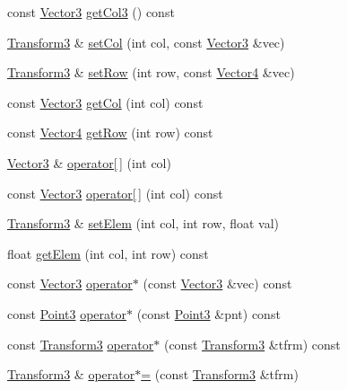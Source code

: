 \begin{DoxyCompactItemize}
\item 
const \hyperlink{classVectormath_1_1Aos_1_1Vector3}{Vector3} \hyperlink{classVectormath_1_1Aos_1_1Transform3_a06e3160b31b82a325a0a204082bc4720}{get\-Col3} () const 
\item 
\hyperlink{classVectormath_1_1Aos_1_1Transform3}{Transform3} \& \hyperlink{classVectormath_1_1Aos_1_1Transform3_a0a4ba5d1dbbdb94b14efacc20897d001}{set\-Col} (int col, const \hyperlink{classVectormath_1_1Aos_1_1Vector3}{Vector3} \&vec)
\item 
\hyperlink{classVectormath_1_1Aos_1_1Transform3}{Transform3} \& \hyperlink{classVectormath_1_1Aos_1_1Transform3_a0bc58cd41ab7c52cda6f86e1780d1ad4}{set\-Row} (int row, const \hyperlink{classVectormath_1_1Aos_1_1Vector4}{Vector4} \&vec)
\item 
const \hyperlink{classVectormath_1_1Aos_1_1Vector3}{Vector3} \hyperlink{classVectormath_1_1Aos_1_1Transform3_a6c04fe588c10315223cb2583618b260e}{get\-Col} (int col) const 
\item 
const \hyperlink{classVectormath_1_1Aos_1_1Vector4}{Vector4} \hyperlink{classVectormath_1_1Aos_1_1Transform3_ac38d9f289e1d523c7aaeb980d31532a6}{get\-Row} (int row) const 
\item 
\hyperlink{classVectormath_1_1Aos_1_1Vector3}{Vector3} \& \hyperlink{classVectormath_1_1Aos_1_1Transform3_ae72712700374ed276af6e06f2eae50a1}{operator\mbox{[}$\,$\mbox{]}} (int col)
\item 
const \hyperlink{classVectormath_1_1Aos_1_1Vector3}{Vector3} \hyperlink{classVectormath_1_1Aos_1_1Transform3_a8dcf15dbc045d038e3fe11c1eaf8f9cb}{operator\mbox{[}$\,$\mbox{]}} (int col) const 
\item 
\hyperlink{classVectormath_1_1Aos_1_1Transform3}{Transform3} \& \hyperlink{classVectormath_1_1Aos_1_1Transform3_ab8d7007317ffc2ef1d0bdf838acfce36}{set\-Elem} (int col, int row, float val)
\item 
float \hyperlink{classVectormath_1_1Aos_1_1Transform3_aa351e32f7c872626e71e1554a6489f36}{get\-Elem} (int col, int row) const 
\item 
const \hyperlink{classVectormath_1_1Aos_1_1Vector3}{Vector3} \hyperlink{classVectormath_1_1Aos_1_1Transform3_a02d3e76a76eca287c89e6d725661dc9b}{operator$\ast$} (const \hyperlink{classVectormath_1_1Aos_1_1Vector3}{Vector3} \&vec) const 
\item 
const \hyperlink{classVectormath_1_1Aos_1_1Point3}{Point3} \hyperlink{classVectormath_1_1Aos_1_1Transform3_afb24b2eb78a98ab5afeb4202976f3f6f}{operator$\ast$} (const \hyperlink{classVectormath_1_1Aos_1_1Point3}{Point3} \&pnt) const 
\item 
const \hyperlink{classVectormath_1_1Aos_1_1Transform3}{Transform3} \hyperlink{classVectormath_1_1Aos_1_1Transform3_aaafd7e1c85d3fa3c7aa12563fe0ccd18}{operator$\ast$} (const \hyperlink{classVectormath_1_1Aos_1_1Transform3}{Transform3} \&tfrm) const 
\item 
\hyperlink{classVectormath_1_1Aos_1_1Transform3}{Transform3} \& \hyperlink{classVectormath_1_1Aos_1_1Transform3_a0a02f0eca1169fb4d127e21ff0fa4854}{operator$\ast$=} (const \hyperlink{classVectormath_1_1Aos_1_1Transform3}{Transform3} \&tfrm)
\end{DoxyCompactItemize}
